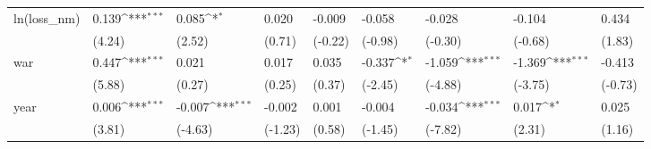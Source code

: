 \def\sym#1{\ifmmode^{#1}\else\(^{#1}\)\fi}
\begin{tabular}{p{1.5cm} p{2cm} p{1.7cm} p{1.7cm} p{1.7cm} p{1.7cm} p{1.7cm} p{1.7cm} p{1.7cm}}
\hline
ln(loss\_nm)     &    0.139\sym{***}&    0.085\sym{*}  &    0.020         &   -0.009         &   -0.058         &   -0.028         &   -0.104         &    0.434         \\
                &   (4.24)         &   (2.52)         &   (0.71)         &  (-0.22)         &  (-0.98)         &  (-0.30)         &  (-0.68)         &   (1.83)         \\
war             &    0.447\sym{***}&    0.021         &    0.017         &    0.035         &   -0.337\sym{*}  &   -1.059\sym{***}&   -1.369\sym{***}&   -0.413         \\
                &   (5.88)         &   (0.27)         &   (0.25)         &   (0.37)         &  (-2.45)         &  (-4.88)         &  (-3.75)         &  (-0.73)         \\
year            &    0.006\sym{***}&   -0.007\sym{***}&   -0.002         &    0.001         &   -0.004         &   -0.034\sym{***}&    0.017\sym{*}  &    0.025         \\
                &   (3.81)         &  (-4.63)         &  (-1.23)         &   (0.58)         &  (-1.45)         &  (-7.82)         &   (2.31)         &   (1.16)         \\
\end{tabular}
